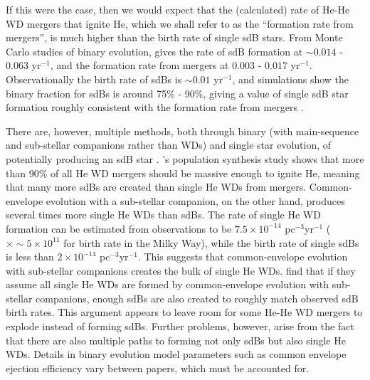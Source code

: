 If this were the case, then we would expect that the (calculated) rate of He-He WD mergers that ignite He, which we shall refer to as the ``formation rate from mergers'', is much higher than the birth rate of single sdB stars.  From Monte Carlo studies of binary evolution, \citeauthor{han+03} gives the rate of sdB formation at $\sim 0.014$ - 0.063 yr$^{-1}$, and the formation rate from mergers at $0.003$ - $0.017$ yr$^{-1}$.  Observationally the birth rate of sdBs is $\sim 0.01$ yr$^{-1}$, and simulations show the binary fraction for sdBs is around 75\% - 90\%, giving a value of single sdB star formation roughly consistent with the formation rate from mergers \citep{nele+01,han+03,hebe09}.  

There are, however, multiple methods, both through binary (with main-sequence and sub-stellar companions rather than WDs) and single star evolution, of potentially producing an sdB star \citep{hebe09,nele10}.  \cite{nele10}'s population synthesis study shows that more than 90\% of all He WD mergers should be massive enough to ignite He, meaning that many more sdBs are created than single He WDs from mergers.  Common-envelope evolution with a sub-stellar companion, on the other hand, produces several times more single He WDs than sdBs.  The rate of single He WD formation can be estimated from observations to be $7.5 \times 10^{-14}$ pc$^{-3}$yr$^{-1}$ ($\times \sim 5 \times 10^{11}$ for birth rate in the Milky Way), while the birth rate of single sdBs is less than $2 \times 10^{-14}$ pc$^{-3}$yr$^{-1}$.  This suggests that common-envelope evolution with sub-stellar companions creates the bulk of single He WDs.  \cite{nele10} find that if they assume all single He WDs are formed by common-envelope evolution with sub-stellar companions, enough sdBs are also created to roughly match observed sdB birth rates.  This argument appears to leave room for some He-He WD mergers to explode instead of forming sdBs.  Further problems, however, arise from the fact that there are also multiple paths to forming not only sdBs but also single He WDs.  Details in binary evolution model parameters such as common envelope ejection efficiency vary between papers, which must be accounted for.






